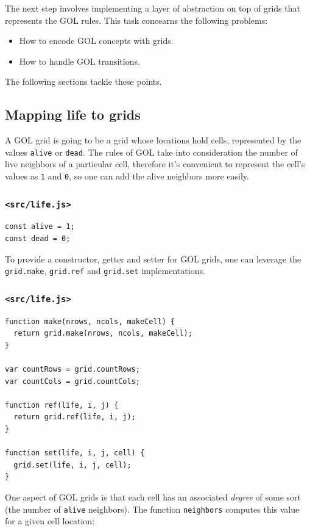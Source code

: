 \documentclass[11pt]{article}
\begin{document}
The next step involves implementing a layer of abstraction on top of grids that represents the GOL rules. This task concearns the following problems:
\begin{itemize}
\item How to encode GOL concepts with grids.
\item How to handle GOL transitions.
\end{itemize}

The following sections tackle these points.

\subsection{Mapping life to grids}
\label{sec:org870b5c6}

A GOL grid is going to be a grid whose locations hold cells, represented by the values \texttt{alive} or \texttt{dead}. The rules of GOL take into consideration the number of live neighbors of a particular cell, therefore it's convenient to represent the cell's values as \texttt{1} and \texttt{0}, so one can add the alive neighbors more easily.

\subsubsection{\texttt{<src/life.js>}}
\label{sec:org8435b3c}
\begin{verbatim}
const alive = 1;
const dead = 0;
\end{verbatim}

To provide a constructor, getter and setter for GOL grids, one can leverage the \texttt{grid.make}, \texttt{grid.ref} and \texttt{grid.set} implementations.

\subsubsection{\texttt{<src/life.js>}}
\label{sec:org5b430d7}
\begin{verbatim}
function make(nrows, ncols, makeCell) {
  return grid.make(nrows, ncols, makeCell);
}

var countRows = grid.countRows;
var countCols = grid.countCols;

function ref(life, i, j) {
  return grid.ref(life, i, j);
}

function set(life, i, j, cell) {
  grid.set(life, i, j, cell);
}
\end{verbatim}

One aspect of GOL grids is that each cell has an associated \emph{degree} of some sort (the number of \texttt{alive} neighbors). The function \texttt{neighbors} computes this value for a given cell location:
\end{document}
